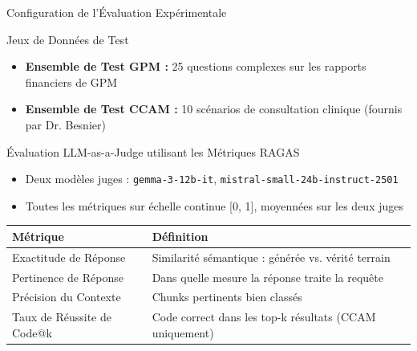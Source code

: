 \documentclass[11pt, aspectratio=169, xcolor=table]{beamer}
\begin{document}
\begin{frame}{Configuration de l'Évaluation Expérimentale}
    \footnotesize 
    \begin{block}{Jeux de Données de Test}
        \begin{itemize}
            \item \textbf{Ensemble de Test GPM :} 25 questions complexes sur les rapports financiers de GPM
            \item \textbf{Ensemble de Test CCAM :} 10 scénarios de consultation clinique (fournis par Dr. Besnier)
        \end{itemize}
    \end{block}

    \begin{block}{Évaluation LLM-as-a-Judge utilisant les Métriques RAGAS}
        \begin{itemize}
            \item Deux modèles juges : \texttt{gemma-3-12b-it}, \texttt{mistral-small-24b-instruct-2501}
            \item Toutes les métriques sur échelle continue [0, 1], moyennées sur les deux juges
        \end{itemize}
    \end{block}

    \begin{table}
        \centering
        \small
        \begin{tabular}{lp{8cm}}
            \toprule
            \textbf{Métrique} & \textbf{Définition} \\
            \midrule
            Exactitude de Réponse & Similarité sémantique : générée vs. vérité terrain \\
            Pertinence de Réponse & Dans quelle mesure la réponse traite la requête \\
            Précision du Contexte & Chunks pertinents bien classés \\
            Taux de Réussite de Code@k & Code correct dans les top-k résultats (CCAM uniquement) \\
            \bottomrule
        \end{tabular}
    \end{table}
\end{frame}
\end{document}
